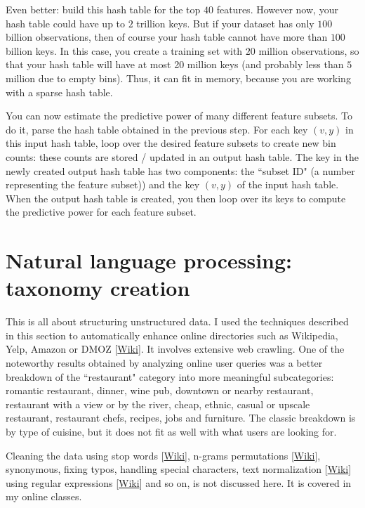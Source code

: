 \documentclass[oneside,10pt]{book}
\begin{document}
Even better: build this hash table for the top $40$ features. However now, your hash table could have up to $2$ trillion keys. But if your dataset has only $100$ billion observations, then of course your hash table cannot have more than $100$ billion keys. In this case,  you create a training set with $20$ million observations, so that your hash table will have at most 20 million keys (and probably less than $5$ million due to empty bins). Thus, it can fit in memory, because
 you are working with a \textcolor{index}{sparse hash table}.



You can now estimate the predictive power of many different feature subsets. To do it, parse the hash table obtained in the previous step. For each
key $(v,y)$ in this input  hash table, loop over the desired feature subsets to create new bin counts: these counts are stored / updated in an output hash table. The key in the newly created output hash table has two components: the ``subset ID" (a number representing the feature subset)) and
 the key $(v, y)$ of the input hash table.
When the output hash table is created, you then loop over its keys to compute the predictive power for each feature subset.

\section{Natural language processing: taxonomy creation}\label{nlp21}

This is all about structuring unstructured data. I used the techniques described in this section to automatically enhance online directories such as Wikipedia, Yelp, Amazon or DMOZ [\href{https://en.wikipedia.org/wiki/DMOZ}{Wiki}].
It involves extensive web crawling. One of the noteworthy results obtained  by analyzing online user queries was a better breakdown of the ``restaurant" category into more meaningful subcategories: romantic restaurant, dinner, wine pub, downtown or nearby restaurant, restaurant with a view or by the river, cheap, ethnic, casual or upscale restaurant, restaurant chefs, recipes, jobs and furniture. The classic breakdown is by type of cuisine, but it does not fit as well with what users are looking for.

Cleaning the data using \textcolor{index}{stop words} [\href{https://en.wikipedia.org/wiki/Stop_word}{Wiki}], \textcolor{index}{n-grams}
 permutations [\href{https://en.wikipedia.org/wiki/N-gram}{Wiki}], synonymous, fixing typos, handling special characters,
 \textcolor{index}{text normalization} [\href{https://en.wikipedia.org/wiki/Text_normalization}{Wiki}] using \textcolor{index}{regular expressions} [\href{https://en.wikipedia.org/wiki/Regular_expression}{Wiki}] and so on, is not discussed here. It is covered in my online classes.
\end{document}
